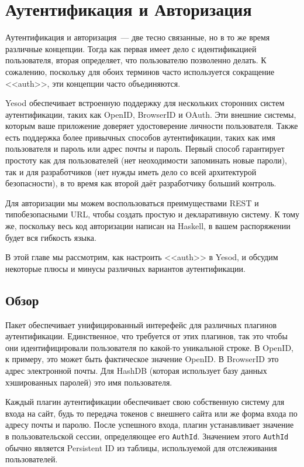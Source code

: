 \chapter{Аутентификация и Авторизация}\label{chap:auth}

Аутентификация и авторизация~--- две тесно связанные, но в то же время различные концепции. Тогда как первая имеет дело с идентификацией пользователя, вторая определяет, что пользователю позволенно делать. К сожалению, поскольку для обоих терминов часто используется сокращение <<auth>>, эти концепции часто объединяются.

Yesod обеспечивает встроенную поддержку для нескольких сторонних систем аутентификации, таких как OpenID, BrowserID и OAuth. Эти внешние системы, которым ваше приложение доверяет удостоверение личности пользователя. Также есть поддержка более привычных способов аутентификации, таких как имя пользователя и пароль или адрес почты и пароль. Первый способ гарантирует простоту как для пользователей (нет неоходимости запоминать новые пароли), так и для разработчиков (нет нужды иметь дело со всей архитектурой безопасности), в то время как второй даёт разработчику больший контроль.

Для авторизации мы можем воспользоваться преимуществами REST и типобезопасными URL, чтобы создать простую и декларативную систему. К тому же, поскольку весь код авторизации написан на Haskell, в вашем распоряжении будет вся гибкость языка.

В этой главе мы рассмотрим, как настроить <<auth>> в Yesod, и обсудим некоторые плюсы и минусы различных вариантов аутентификации.

\section{Обзор}


Пакет  обеспечивает унифицированный интерефейс для различных плагинов аутентификации. Единственное, что требуется от этих плагинов, так это чтобы они идентифицировали пользователя по какой-то уникальной строке. В OpenID, к примеру, это может быть фактическое значение OpenID. В BrowserID это адрес электронной почты. Для HashDB (которая использует базу данных хэшированных паролей) это имя пользователя.

Каждый плагин аутентификации обеспечивает свою собственную систему для входа на сайт, будь то передача токенов с внешнего сайта или же форма входа по адресу почты и паролю. После успешного входа, плагин устанавливает значение в пользовательской сессии, определяющее его \lstinline'AuthId'. Значением этого \lstinline'AuthId' обычно является Persistent ID из таблицы, используемой для отслеживания пользователей. 

